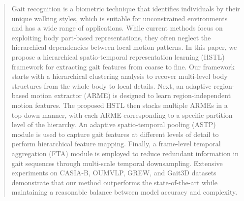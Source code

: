 \documentclass[10pt,twocolumn,letterpaper]{article}
\begin{document}
\begin{abstract}
Gait recognition is a biometric technique that identifies individuals by their unique walking styles, which is suitable for unconstrained environments and has a wide range of applications. While current methods focus on exploiting body part-based representations, they often neglect the hierarchical dependencies between local motion patterns. In this paper, we propose a hierarchical spatio-temporal representation learning (HSTL) framework for extracting gait features from coarse to fine.  Our framework starts with a hierarchical clustering analysis to recover multi-level body structures from the whole body to local details. Next, an adaptive region-based motion extractor (ARME) is designed to learn region-independent motion features. The proposed HSTL then stacks multiple ARMEs in a top-down manner, with each ARME corresponding to a specific partition level of the hierarchy. An adaptive spatio-temporal pooling (ASTP) module is used to capture gait features at different levels of detail to perform hierarchical feature mapping. Finally, a frame-level temporal aggregation (FTA) module is employed to reduce redundant information in gait sequences through multi-scale temporal downsampling. Extensive experiments on CASIA-B, OUMVLP, GREW, and Gait3D datasets demonstrate that our method outperforms the state-of-the-art while maintaining a reasonable balance between model accuracy and complexity.




\end{abstract}
\end{document}
